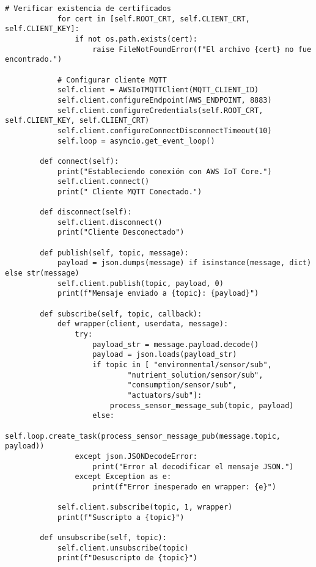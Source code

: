 \begin{lstlisting}[label=cod:mqtt_connection,caption=Cliente MQTT, language=PythonUTF8]
            # Verificar existencia de certificados
            for cert in [self.ROOT_CRT, self.CLIENT_CRT, self.CLIENT_KEY]:
                if not os.path.exists(cert):
                    raise FileNotFoundError(f"El archivo {cert} no fue encontrado.")
    
            # Configurar cliente MQTT
            self.client = AWSIoTMQTTClient(MQTT_CLIENT_ID)
            self.client.configureEndpoint(AWS_ENDPOINT, 8883)
            self.client.configureCredentials(self.ROOT_CRT, self.CLIENT_KEY, self.CLIENT_CRT)
            self.client.configureConnectDisconnectTimeout(10)
            self.loop = asyncio.get_event_loop()
    
        def connect(self):
            print("Estableciendo conexión con AWS IoT Core.")
            self.client.connect()
            print(" Cliente MQTT Conectado.")
    
        def disconnect(self):
            self.client.disconnect()
            print("Cliente Desconectado")
    
        def publish(self, topic, message):
            payload = json.dumps(message) if isinstance(message, dict) else str(message)
            self.client.publish(topic, payload, 0)
            print(f"Mensaje enviado a {topic}: {payload}")
    
        def subscribe(self, topic, callback):
            def wrapper(client, userdata, message):
                try:
                    payload_str = message.payload.decode()
                    payload = json.loads(payload_str)
                    if topic in [ "environmental/sensor/sub", 
                            "nutrient_solution/sensor/sub", 
                            "consumption/sensor/sub", 
                            "actuators/sub"]:
                        process_sensor_message_sub(topic, payload)
                    else:
                        self.loop.create_task(process_sensor_message_pub(message.topic, payload))
                except json.JSONDecodeError:
                    print("Error al decodificar el mensaje JSON.")
                except Exception as e:
                    print(f"Error inesperado en wrapper: {e}")
            
            self.client.subscribe(topic, 1, wrapper)
            print(f"Suscripto a {topic}")
    
        def unsubscribe(self, topic):
            self.client.unsubscribe(topic)
            print(f"Desuscripto de {topic}")    
        \end{lstlisting}

